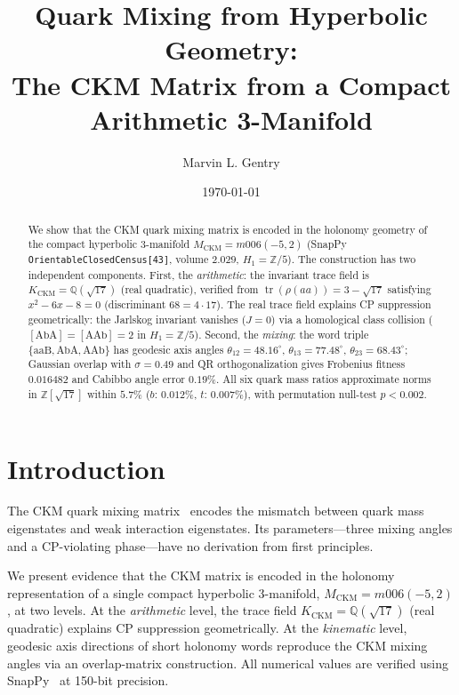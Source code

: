 \documentclass[11pt,a4paper]{article}
\begin{document}
\title{Quark Mixing from Hyperbolic Geometry:\\
The CKM Matrix from a Compact Arithmetic 3-Manifold}

\author[1]{Marvin L. Gentry}
\date{\today}

\begin{abstract}
We show that the CKM quark mixing matrix is encoded in the holonomy
geometry of the compact hyperbolic 3-manifold $M_{\mathrm{CKM}} =
m006(-5,2)$ (SnapPy \texttt{OrientableClosedCensus[43]}, volume
$2.029$, $H_1=\mathbb{Z}/5$).
The construction has two independent components.
First, the \emph{arithmetic}: the invariant trace field is
$K_{\mathrm{CKM}}=\mathbb{Q}(\sqrt{17})$ (real quadratic), verified
from $\operatorname{tr}(\rho(aa))=3-\sqrt{17}$ satisfying
$x^2-6x-8=0$ (discriminant $68=4\cdot17$).
The real trace field explains CP suppression geometrically: the
Jarlskog invariant vanishes ($J=0$) via a homological class collision
($[\mathrm{AbA}]=[\mathrm{AAb}]=2$ in $H_1=\mathbb{Z}/5$).
Second, the \emph{mixing}: the word triple
$\{\mathrm{aaB},\mathrm{AbA},\mathrm{AAb}\}$ has geodesic axis angles
$\theta_{12}=48.16^\circ$, $\theta_{13}=77.48^\circ$,
$\theta_{23}=68.43^\circ$; Gaussian overlap with $\sigma=0.49$ and QR
orthogonalization gives Frobenius fitness $0.016482$ and Cabibbo angle
error $0.19\%$.
All six quark mass ratios approximate norms
in $\mathbb{Z}[\sqrt{17}]$ within $5.7\%$ ($b$: $0.012\%$, $t$:
$0.007\%$), with permutation null-test $p<0.002$.
\end{abstract}

\maketitle

\section{Introduction}
\label{sec:intro}

The CKM quark mixing matrix~\cite{Cabibbo1963,KobayashiMaskawa1973}
encodes the mismatch between quark mass eigenstates and weak
interaction eigenstates. Its parameters---three mixing angles and a
CP-violating phase---have no derivation from first principles.

We present evidence that the CKM matrix is encoded in the holonomy
representation of a single compact hyperbolic 3-manifold,
$M_{\mathrm{CKM}} = m006(-5,2)$, at two levels.
At the \emph{arithmetic} level, the trace field
$K_{\mathrm{CKM}} = \mathbb{Q}(\sqrt{17})$ (real quadratic) explains
CP suppression geometrically.
At the \emph{kinematic} level, geodesic axis directions of short
holonomy words reproduce the CKM mixing angles via an overlap-matrix
construction.
All numerical values are verified using SnapPy~\cite{SnapPy} at
150-bit precision.
\end{document}
